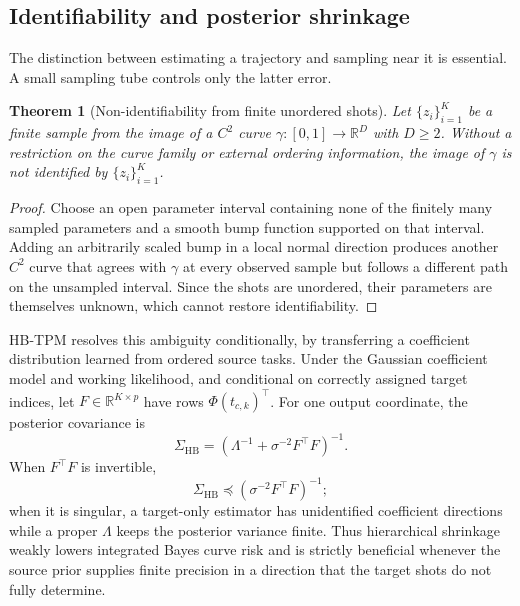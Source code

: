 \documentclass[preprint,12pt,number]{elsarticle}
\newtheorem{theorem}{Theorem}
\begin{document}
\subsection{Identifiability and posterior shrinkage}
The distinction between estimating a trajectory and sampling near it is essential. A small sampling tube controls only the latter error.

\begin{theorem}[Non-identifiability from finite unordered shots]
	Let $\{z_i\}_{i=1}^{K}$ be a finite sample from the image of a $C^2$ curve $\gamma:[0,1]\to\mathbb{R}^{D}$ with $D\ge2$. Without a restriction on the curve family or external ordering information, the image of $\gamma$ is not identified by $\{z_i\}_{i=1}^{K}$.
\end{theorem}

\begin{proof}
	Choose an open parameter interval containing none of the finitely many sampled parameters and a smooth bump function supported on that interval. Adding an arbitrarily scaled bump in a local normal direction produces another $C^2$ curve that agrees with $\gamma$ at every observed sample but follows a different path on the unsampled interval. Since the shots are unordered, their parameters are themselves unknown, which cannot restore identifiability.
\end{proof}

HB-TPM resolves this ambiguity conditionally, by transferring a coefficient distribution learned from ordered source tasks. Under the Gaussian coefficient model and working likelihood, and conditional on correctly assigned target indices, let $F\in\mathbb{R}^{K\times p}$ have rows $\Phi(t_{c,k})^\top$. For one output coordinate, the posterior covariance is
\begin{equation}
	\Sigma_{\mathrm{HB}}
	=\left(\Lambda^{-1}+\sigma^{-2}F^\top F\right)^{-1}.
	\label{eq:hb_posterior_covariance}
\end{equation}
When $F^\top F$ is invertible,
\[
	\Sigma_{\mathrm{HB}}\preceq
	\left(\sigma^{-2}F^\top F\right)^{-1};
\]
when it is singular, a target-only estimator has unidentified coefficient directions while a proper $\Lambda$ keeps the posterior variance finite. Thus hierarchical shrinkage weakly lowers integrated Bayes curve risk and is strictly beneficial whenever the source prior supplies finite precision in a direction that the target shots do not fully determine.
\end{document}
